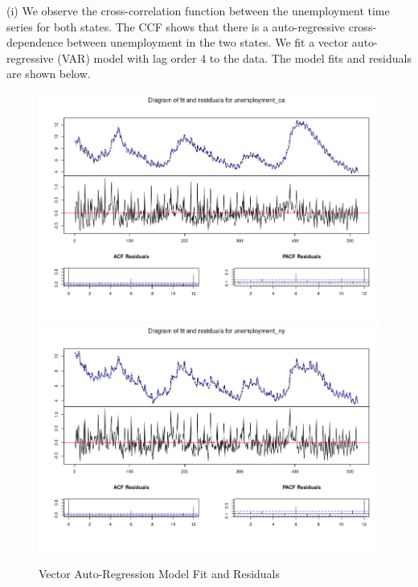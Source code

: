\documentclass{article}
\begin{document}
\noindent (i) We observe the cross-correlation function between the unemployment time series for both states. The CCF shows that there is a auto-regressive cross-dependence between unemployment in the two states. We fit a vector auto-regressive (VAR) model with lag order 4 to the data. The model fits and residuals are shown below.

\begin{figure}[H]
	
	\includegraphics[width=\linewidth]{ca_var_fit}
	\includegraphics[width=\linewidth]{ny_var_fit}
	\caption{Vector Auto-Regression Model Fit and Residuals} 
\end{figure}
\end{document}
